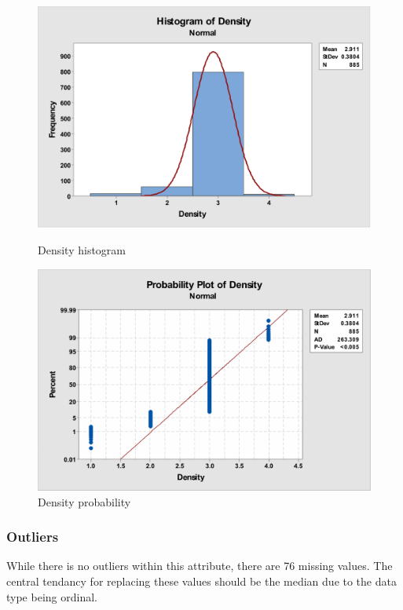\documentclass[12pt]{article}
\begin{document}
        \begin{figure}[H]
          \centering
          \begin{minipage}[b]{0.45\textwidth}
            \includegraphics[width=\textwidth]{density-histogram}
            \caption{Density histogram}
            \label{fig:density-histogram}
          \end{minipage}
          \hfill
          \begin{minipage}[b]{0.45\textwidth}
            \includegraphics[width=\textwidth]{density-probability}
            \caption{Density probability}
            \label{fig:density-probability}
          \end{minipage}
        \end{figure}

      \subsubsection{Outliers}
        While there is no outliers within this attribute, there are 76 missing values. The central tendancy for replacing these values should be the median due to the data type being ordinal.
\end{document}
